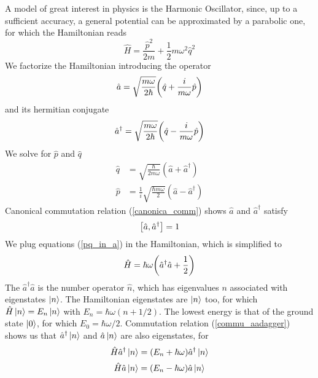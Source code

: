 A model of great interest in physics is the Harmonic Oscillator, since, up to a sufficient accuracy, a general potential can be approximated by a parabolic one, for which the Hamiltonian reads
\begin{equation}
    \hat{H}=\frac{\hat{p}^2}{2m}+\frac{1}{2}m\omega^2\hat{q}^2
    \label{harmonic_hamilt}
\end{equation}
We factorize the Hamiltonian introducing the operator 
\begin{equation}
    \hat{a}=\sqrt{\frac{m\omega}{2\hbar}}\qty(\hat{q}+\frac{i}{m\omega}\hat{p})
\end{equation}
and its hermitian conjugate
\begin{equation}
    \hat{a}^\dagger=\sqrt{\frac{m\omega}{2\hbar}}\qty(\hat{q}-\frac{i}{m\omega}\hat{p})
\end{equation}
We solve for $\hat{p}$ and $\hat{q}$ 
\begin{equation}
\begin{aligned}
\hat{q} &=\sqrt{\frac{\hbar}{2 m \omega}}\left(\hat{a}+\hat{a}^{\dagger}\right) \\
\hat{p} &=\frac{1}{{i}} \sqrt{\frac{\hbar m \omega}{2}}\left(\hat{a}-\hat{a}^{\dagger}\right)
\end{aligned}
\label{pq_in_a}
\end{equation}
Canonical commutation relation (\ref{canonica_comm}) shows $\hat{a}$ and $\hat{a}^\dagger$ satisfy
\begin{equation}
    \comm{\hat{a}}{\hat{a}^\dagger}=1
    \label{commu_aadagger}
\end{equation}
We plug equations (\ref{pq_in_a}) in the Hamiltonian, which is simplified to
\begin{equation}
    \hat{H}=\hbar\omega\qty(\hat{a}^\dagger\hat{a}+\frac{1}{2})
\end{equation}
The $\hat{a}^\dagger\hat{a}$ is the number operator $\hat{n}$, which has eigenvalues $n$ associated with eigenstates $\ket{n}$. The Hamiltonian eigenstates are $\ket{n}$ too, for which $\hat{H}\ket{n}=E_n\ket{n}$ with $E_n=\hbar\omega(n+1/2)$. The lowest energy is that of the ground state $\ket{0}$, for which $E_0=\hbar\omega/2$. Commutation relation (\ref{commu_aadagger}) shows us that $\hat{a}^\dagger\ket{n}$ and $\hat{a}\ket{n}$ are also eigenstates, for
\begin{equation}
    \hat{H}\hat{a}^\dagger\ket{n}=(E_n+\hbar\omega)\hat{a}^\dagger\ket{n}
\end{equation}
\begin{equation}
    \hat{H}\hat{a}\ket{n}=(E_n-\hbar\omega)\hat{a}\ket{n}
\end{equation}
